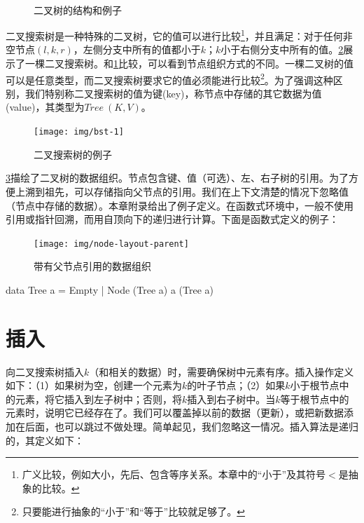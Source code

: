 \documentclass[b5paper]{ctexart}
\begin{document}
\begin{figure}[htbp]
  \centering
   \\
  \caption{二叉树的结构和例子}
  \label{fig:binary-tree-example}
\end{figure}

二叉搜索树是一种特殊的二叉树，它的值可以进行比较\footnote{广义比较，例如大小，先后、包含等序关系。本章中的“小于”及其符号$<$是抽象的比较。}，并且满足：对于任何非空节点$(l, k, r)$，左侧分支中所有的值都小于$k$；$k$小于右侧分支中所有的值。\cref{fig:bst-example}展示了一棵二叉搜索树。和\cref{fig:binary-tree-example}比较，可以看到节点组织方式的不同。一棵二叉树的值可以是任意类型，而二叉搜索树要求它的值必须能进行比较\footnote{只要能进行抽象的“小于”和“等于”比较就足够了。}。为了强调这种区别，我们特别称二叉搜索树的值为键(key)，称节点中存储的其它数据为值(value)，其类型为$Tree\ (K, V)$。

\begin{figure}[htbp]
  \centering
  \texttt{[image: img/bst-1]}
  \caption{二叉搜索树的例子} \label{fig:bst-example}
\end{figure}

\cref{fig:node-layout-parent}描绘了二叉树的数据组织。节点包含键、值（可选）、左、右子树的引用。为了方便上溯到祖先，可以存储指向父节点的引用。我们在上下文清楚的情况下忽略值（节点中存储的数据）。本章附录给出了例子定义。在函数式环境中，一般不使用引用或指针回溯，而用自顶向下的递归进行计算。下面是函数式定义的例子：

\begin{figure}[htbp]
  \centering
  \texttt{[image: img/node-layout-parent]}
  \caption{带有父节点引用的数据组织} \label{fig:node-layout-parent}
\end{figure}

\begin{Haskell}
data Tree a = Empty | Node (Tree a) a (Tree a)
\end{Haskell}

\section{插入}

向二叉搜索树插入$k$（和相关的数据）时，需要确保树中元素有序。插入操作定义如下：（1）如果树为空，创建一个元素为$k$的叶子节点；（2）如果$k$小于根节点中的元素，将它插入到左子树中；否则，将$k$插入到右子树中。当$k$等于根节点中的元素时，说明它已经存在了。我们可以覆盖掉以前的数据（更新），或把新数据添加在后面，也可以跳过不做处理。简单起见，我们忽略这一情况。插入算法是递归的，其定义如下：
\end{document}
